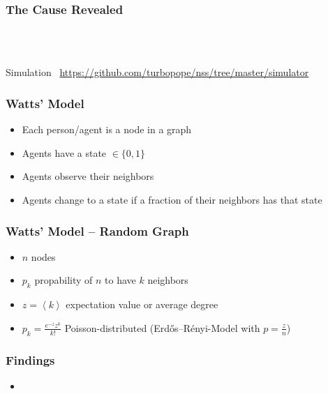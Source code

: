 \documentclass[slidestop,usenames,dvipsnames]{beamer}
\newcommand{\fitem}{\pause\vfill\item}
\newcommand{\gitem}{\vfill\item}
\begin{document}
\begin{frame}
    \frametitle{The Cause Revealed}
    \vfill
    \begin{center}
        \\
        \vspace{20pt}
        \\
        \vspace{20pt}
    \end{center}
    \vfill
\end{frame}

\begin{frame}
    \vfill
    \begin{center}
        {\Huge Simulation}\
        \vfill
        \url{https://github.com/turbopope/nss/tree/master/simulator}
    \end{center}
\end{frame}



\begin{frame}
    \frametitle{Watts' Model}
    \begin{itemize}
        \gitem Each person/agent is a node in a graph
        \gitem Agents have a state $\in \lbrace 0, 1 \rbrace$
        \gitem Agents observe their neighbors
        \gitem Agents change to a state if a fraction of their neighbors has that state
    \end{itemize}
    \vfill
\end{frame}

\begin{frame}
    \frametitle{Watts' Model -- Random Graph}
    \begin{itemize}
        \fitem $n$ nodes
        \fitem $p_k$ propability of $n$ to have $k$ neighbors
        \fitem $z = \left<k\right>$ expectation value or average degree
        \fitem $p_k = \frac{e^{-z}z^k}{k!}$ Poisson-distributed (Erdős–Rényi-Model with $p = \frac{z}{n}$)
    \end{itemize}
    \vfill
\end{frame}

\begin{frame}
    \frametitle{Findings}
    \begin{itemize}
        \fitem
    \end{itemize}
    \vfill
\end{frame}
\end{document}
